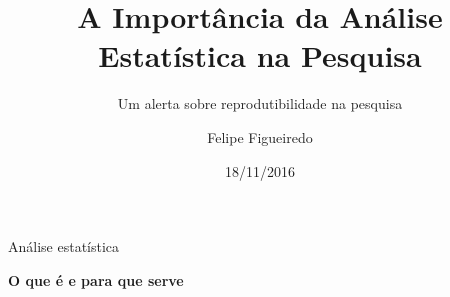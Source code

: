 \documentclass{beamer}
\title[Estatística na Pesquisa] %
{A Importância da Análise Estatística na Pesquisa}
\subtitle
{Um alerta sobre reprodutibilidade na pesquisa} %
\author%
{Felipe Figueiredo}%
\institute[INTO] %
{Mestrado Profissional em Ciências Aplicadas ao Sistema Musculoesquelético\\
Instituto Nacional de Traumatologia e Ortopedia Jamil Haddad
}
\date%
{18/11/2016}
\begin{document}
\begin{frame}
  \titlepage
\end{frame}









\begin{frame}{Análise estatística}
  \begin{center}
    {\bf O que é e para que serve}
  \end{center}
\end{frame}
\end{document}

